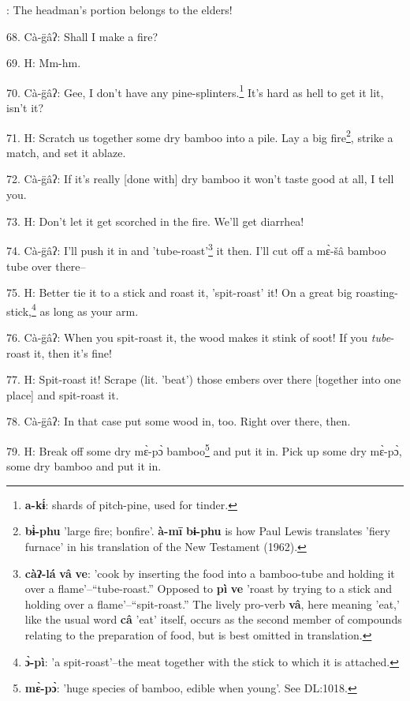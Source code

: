 : The headman's
portion belongs to the elders!

68. Cà-g̈âʔ: Shall I make a fire?

69. H: Mm-hm.

70. Cà-g̈âʔ: Gee, I don't have any pine-splinters.\footnote{\textbf{a-kɨ́}: shards of pitch-pine, used for tinder.} It's hard as hell to
get it lit, isn't it?

71. H: Scratch us together some dry bamboo into a pile. Lay a big fire\footnote{\textbf{bɨ̀-phu} 'large fire; bonfire'. \textbf{à-mī} \textbf{bɨ-phu} is how Paul Lewis translates 'fiery furnace' in his translation of the New Testament (1962).}, strike
a match, and set it ablaze.

72. Cà-g̈âʔ: If it's really [done with] dry bamboo it won't taste good at all,
I tell you.

73. H: Don't let it get scorched in the fire. We'll get diarrhea!

\begin{center}
\end{center}

74. Cà-g̈âʔ: I'll push it in and 'tube-roast'\footnote{\textbf{càʔ-lá} \textbf{vâ} \textbf{ve}: 'cook by inserting the food into a bamboo-tube and holding it over a flame'--``tube-roast.'' Opposed to \textbf{pì} \textbf{ve} 'roast by trying to a stick and holding over a flame'--``spit-roast.'' The lively pro-verb \textbf{vâ}, here meaning 'eat,' like the usual word \textbf{câ} 'eat' itself, occurs as the second member of compounds relating to the preparation of food, but is best omitted in translation.} it then. I'll cut off a
mɛ̀-šâ bamboo tube over there--

75. H: Better tie it to a stick and roast it, 'spit-roast' it! On a great big roasting-stick,\footnote{\textbf{ɔ̀-pì}: 'a spit-roast'--the meat together with the stick to which it is attached.}
as long as your arm.

76. Cà-g̈âʔ: When you spit-roast it, the wood makes it stink of soot! If you
\emph{tube}-roast it, then it's fine!

77. H: Spit-roast it! Scrape (lit. 'beat') those embers over there [together into
one place] and spit-roast it.

78. Cà-g̈âʔ: In that case put some wood in, too. Right over there, then.

79. H: Break off some dry mɛ̀-pɔ̀ bamboo\footnote{\textbf{mɛ̀-pɔ̀}: 'huge species of bamboo, edible when young'. See DL:1018.} and put it in. Pick up some dry
mɛ̀-pɔ̀, some dry bamboo and put it in.

